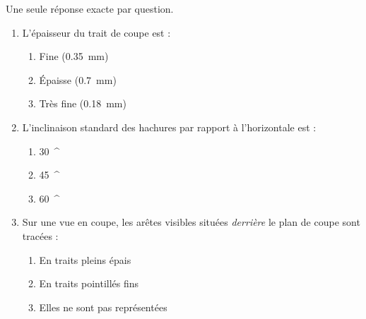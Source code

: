 \documentclass[11pt]{article}
\providecommand{\degree}{^{\circ}}
\begin{document}
\begin{exercice}
Une seule réponse exacte par question.
\begin{enumerate}
    \item L'épaisseur du trait de coupe est :
    \begin{enumerate}
        \item Fine (\SI{0,35}{mm})
        \item Épaisse (\SI{0,7}{mm})
        \item Très fine (\SI{0,18}{mm})
    \end{enumerate}
    \item L'inclinaison standard des hachures par rapport à l'horizontale est :
    \begin{enumerate}
        \item \SI{30}{\degree}
        \item \SI{45}{\degree}
        \item \SI{60}{\degree}
    \end{enumerate}
    \item Sur une vue en coupe, les arêtes visibles situées \textit{derrière} le plan de coupe sont tracées :
    \begin{enumerate}
        \item En traits pleins épais
        \item En traits pointillés fins
        \item Elles ne sont pas représentées
    \end{enumerate}
\end{enumerate}
\end{exercice}
\end{document}
